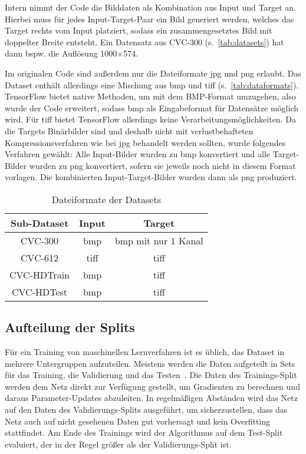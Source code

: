 Intern nimmt der Code die Bilddaten als Kombination aus Input und Target an.
Hierbei muss für jedes Input-Target-Paar ein Bild generiert werden, welches das Target rechts vom Input platziert, sodass ein zusammengesetztes Bild mit doppelter Breite entsteht.
Ein Datensatz aus CVC-300 (s.~\autoref{tab:datasets}) hat dann bspw. die Auflösung 1000$\times$574.

Im originalen Code sind außerdem nur die Dateiformate \gls{jpg} und \gls{png} erlaubt.
Das Dataset enthält allerdings eine Mischung aus \gls{bmp} und \gls{tiff} (s.~\autoref{tab:dataformats}).
TensorFlow bietet native Methoden, um mit dem BMP-Format umzugehen, also wurde der Code erweitert, sodass \gls{bmp} als Eingabeformat für Datensätze möglich wird.
Für \gls{tiff} bietet TensorFlow allerdings keine Verarbeitungsmöglichkeiten.
Da die Targets Binärbilder sind und deshalb nicht mit verlustbehafteten Kompressionsverfahren wie bei \gls{jpg} behandelt werden sollten, wurde folgendes Verfahren gewählt:
Alle Input-Bilder wurden zu \gls{bmp} konvertiert und alle Target-Bilder wurden zu \gls{png} konvertiert, sofern sie jeweils noch nicht in diesem Format vorlagen.
Die kombinierten Input-Target-Bilder wurden dann als \gls{png} produziert.

\begin{table}
	\centering
	\caption{Dateiformate der Datasets}
	\label{tab:dataformats}
	\begin{tabular}{ccc} 
		\toprule
		Sub-Dataset & Input & Target \\ 
		\midrule
		CVC-300 & \gls{bmp} & \gls{bmp} mit nur 1 Kanal \\
		CVC-612 & \gls{tiff} & \gls{tiff} \\
		CVC-HDTrain & \gls{bmp} & \gls{tiff} \\
		CVC-HDTest & \gls{bmp} & \gls{tiff} \\
		\bottomrule
	\end{tabular}
\end{table}



\subsection{Aufteilung der Splits}

Für ein Training von maschinellen Lernverfahren ist es üblich, das Dataset in mehrere Untergruppen aufzuteilen.
Meistens werden die Daten aufgeteilt in Sets für das Training, die Validierung und das Testen~\cite{Guyon.1997}.
Die Daten des Trainings-Split werden dem Netz direkt zur Verfügung gestellt, um Gradienten zu berechnen und daraus Parameter-Updates abzuleiten.
In regelmäßigen Abständen wird das Netz auf den Daten des Validierungs-Splits ausgeführt, um sicherzustellen, dass das Netz auch auf nicht gesehenen Daten gut vorhersagt und kein Overfitting stattfindet.
Am Ende des Trainings wird der Algorithmus auf dem Test-Split evaluiert, der in der Regel größer als der Validierungs-Split ist.

